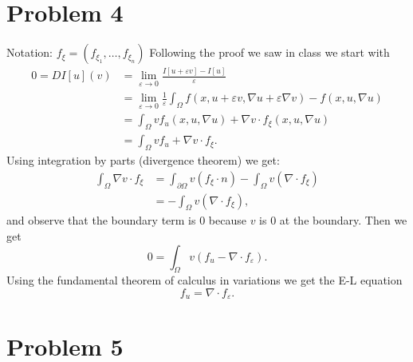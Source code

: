 \documentclass{article}
\begin{document}
\section{Problem 4}
Notation: $f_\xi = (f_{\xi_1},\dots,f_{\xi_n})$
Following the proof we saw in class we start with
\begin{align*}
	0=DI[u](v)
	&= \lim_{\varepsilon \to 0}\frac{I[u+\varepsilon v]-I[u]}{\varepsilon}\\
	&=\lim_{\varepsilon \to 0} \frac{1}{\varepsilon}\int_\Omega f(x,u+\varepsilon v,\nabla u+\varepsilon
	\nabla v)-f(x,u,\nabla u)\\
	&=\int_\Omega vf_u(x,u,\nabla u)+\nabla v\cdot f_\xi(x,u,\nabla u)\\
	&=\int_\Omega vf_u+\nabla v\cdot f_\xi.
\end{align*}
Using integration by parts (divergence theorem) we get:
\begin{align*}
	\int_\Omega\nabla v \cdot f_\xi
	&= \int_{\partial\Omega}v (f_\xi \cdot n) - \int_\Omega v (\nabla \cdot f_\xi)\\
	&= - \int_\Omega v (\nabla \cdot f_\xi),
\end{align*}
and observe that the boundary term is 0 because $v$ is 0 at
the boundary.
Then we get
\[
	0=\int_\Omega v(f_u-\nabla \cdot f_\varepsilon).
\]
Using the fundamental theorem of calculus in variations we get the E-L
equation
\[
	f_u=\nabla \cdot f_\varepsilon.
\]
\section{Problem 5}
\end{document}
